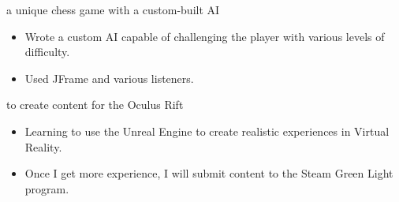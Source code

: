 \documentclass[11pt]{article} %
\begin{document}
\begin{description}
	{\Large \item[AntiChess] a unique chess game with a custom-built AI }
	\begin{itemize}
		\item Wrote a custom AI capable of challenging the player with various levels of difficulty.
		\item Used JFrame and various listeners.
	\end{itemize}
	{\Large \item[Unreal Engine 4] to create content for the Oculus Rift}
	\begin{itemize}
		\item Learning to use the Unreal Engine to create realistic experiences in Virtual Reality.
		\item Once I get more experience, I will submit content to the Steam Green Light program.
	\end{itemize}
\end{description}
\noindent {\huge \bf}
\end{document}
